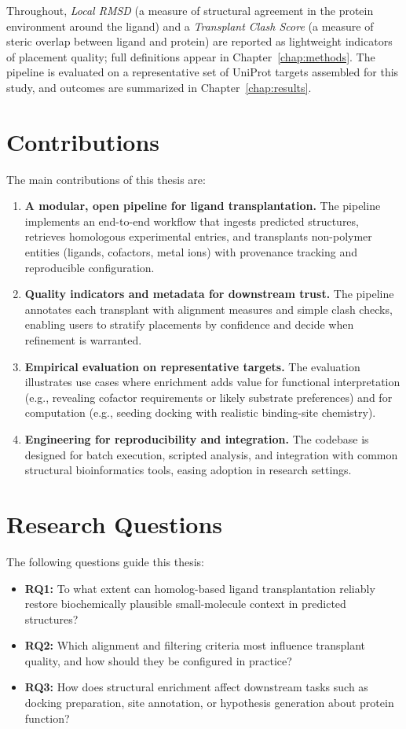 Throughout, \emph{Local RMSD} (a measure of structural agreement in the protein environment around the ligand) and a \emph{Transplant Clash Score} (a measure of steric overlap between ligand and protein) are reported as lightweight indicators of placement quality; full definitions appear in Chapter~\ref{chap:methods}. The pipeline is evaluated on a representative set of UniProt targets assembled for this study, and outcomes are summarized in Chapter~\ref{chap:results}.

\section{Contributions}
The main contributions of this thesis are:
\begin{enumerate}
    \item \textbf{A modular, open pipeline for ligand transplantation.} The pipeline implements an end-to-end workflow that ingests predicted structures, retrieves homologous experimental entries, and transplants non-polymer entities (ligands, cofactors, metal ions) with provenance tracking and reproducible configuration.
    \item \textbf{Quality indicators and metadata for downstream trust.} The pipeline annotates each transplant with alignment measures and simple clash checks, enabling users to stratify placements by confidence and decide when refinement is warranted.
    \item \textbf{Empirical evaluation on representative targets.} The evaluation illustrates use cases where enrichment adds value for functional interpretation (e.g., revealing cofactor requirements or likely substrate preferences) and for computation (e.g., seeding docking with realistic binding-site chemistry).%
    \item \textbf{Engineering for reproducibility and integration.} The codebase is designed for batch execution, scripted analysis, and integration with common structural bioinformatics tools, easing adoption in research settings.
\end{enumerate}

\section{Research Questions}
The following questions guide this thesis:
\begin{itemize}
    \item \textbf{RQ1:} To what extent can homolog-based ligand transplantation reliably restore biochemically plausible small-molecule context in predicted structures?
    \item \textbf{RQ2:} Which alignment and filtering criteria most influence transplant quality, and how should they be configured in practice?
    \item \textbf{RQ3:} How does structural enrichment affect downstream tasks such as docking preparation, site annotation, or hypothesis generation about protein function?
\end{itemize}

